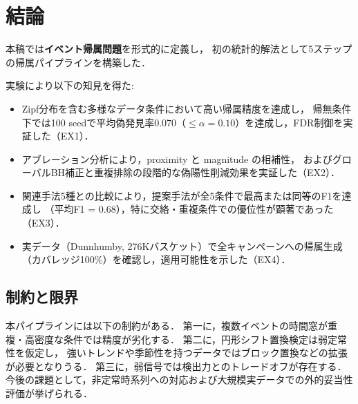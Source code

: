 \section{結論}\label{sec:conclusion}

本稿では\textbf{イベント帰属問題}を形式的に定義し，
初の統計的解法として5ステップの帰属パイプラインを構築した．

実験により以下の知見を得た:
\begin{itemize}
\item Zipf分布を含む多様なデータ条件において高い帰属精度を達成し，
帰無条件下では100 seedで平均偽発見率0.070（$\leq \alpha = 0.10$）を達成し，FDR制御を実証した（EX1）．
\item アブレーション分析により，proximity と magnitude の相補性，
およびグローバルBH補正と重複排除の段階的な偽陽性削減効果を実証した（EX2）．
\item 関連手法5種との比較により，提案手法が全5条件で最高または同等のF1を達成し
（平均F1 = 0.68），特に交絡・重複条件での優位性が顕著であった（EX3）．
\item 実データ（Dunnhumby, 276Kバスケット）で全キャンペーンへの帰属生成（カバレッジ100\%）を確認し，適用可能性を示した（EX4）．
\end{itemize}

\subsection{制約と限界}

本パイプラインには以下の制約がある．
第一に，複数イベントの時間窓が重複・高密度な条件では精度が劣化する．
第二に，円形シフト置換検定は弱定常性を仮定し，
強いトレンドや季節性を持つデータではブロック置換などの拡張が必要となりうる．
第三に，弱信号では検出力とのトレードオフが存在する．
今後の課題として，非定常時系列への対応および大規模実データでの外的妥当性評価が挙げられる．
